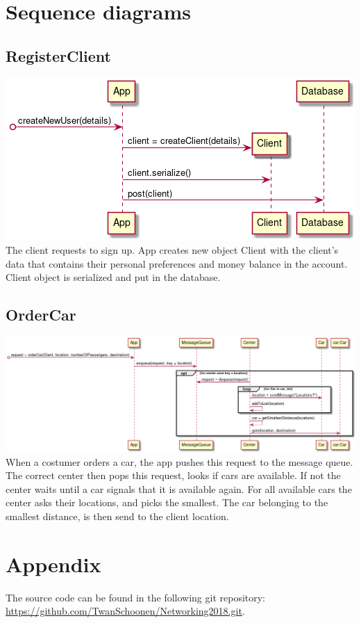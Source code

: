 \documentclass[a4paper]{article}
\begin{document}
\section*{Sequence diagrams}
\subsection*{RegisterClient}
\includegraphics[width=1\textwidth]{../Diagrams/registerClient.png}\\
The client requests to sign up. App creates new object Client with the client's data that contains their personal preferences and money balance in the account. Client object is serialized and put in the database. 
\subsection*{OrderCar}
\includegraphics[width=1\textwidth]{../Diagrams/orderCar.png}\\
When a costumer orders a car, the app pushes this request to the message queue.
The correct center then pops this request, looks if cars are available. If not the center waits until a car signals that it is available again. For all available cars the center asks their locations, and picks the smallest. The car belonging to the smallest distance, is then send to the client location.

\section*{Appendix}
The source code can be found in the following git repository: \url{https://github.com/TwanSchoonen/Networking2018.git}.
\end{document}
